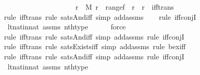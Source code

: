 \begin{isabellebody}
\ \ \ \ \ \ \ \ \ \ \ \ \ \ \ \ \ \ \ \ {\isacharparenleft}{\kern0pt}{\isasymexists}r{\isacharprime}{\kern0pt}\ {\isasymin}\ M{\isachardot}{\kern0pt}\ r{\isacharprime}{\kern0pt}\ {\isacharequal}{\kern0pt}\ range{\isacharparenleft}{\kern0pt}f{\isacharparenright}{\kern0pt}\ {\isasymand}\ r{\isacharprime}{\kern0pt}\ {\isasymsubseteq}\ r{\isacharparenright}{\kern0pt}{\isachardoublequoteclose}\ \ iff{\isacharunderscore}{\kern0pt}trans{\isacharparenright}{\kern0pt}\isanewline
\ \ \ \isamarkupfalse%
{\isacharparenleft}{\kern0pt}rule\ iff{\isacharunderscore}{\kern0pt}trans{\isacharcomma}{\kern0pt}\ rule\ sats{\isacharunderscore}{\kern0pt}And{\isacharunderscore}{\kern0pt}iff{\isacharcomma}{\kern0pt}\ simp\ add{\isacharcolon}{\kern0pt}assms{\isacharparenright}{\kern0pt}\isanewline
\ \ \ \isamarkupfalse%
{\isacharparenleft}{\kern0pt}rule\ iff{\isacharunderscore}{\kern0pt}conjI{}{\isacharparenright}{\kern0pt}\isanewline
\ \ \isamarkupfalse%
\ lt{\isacharunderscore}{\kern0pt}nat{\isacharunderscore}{\kern0pt}in{\isacharunderscore}{\kern0pt}nat\ assms\ nth{\isacharunderscore}{\kern0pt}type\isanewline
\ \ \ \ \isamarkupfalse%
\ force\isanewline
\ \ \ \isamarkupfalse%
{\isacharparenleft}{\kern0pt}rule\ iff{\isacharunderscore}{\kern0pt}trans{\isacharcomma}{\kern0pt}\ rule\ sats{\isacharunderscore}{\kern0pt}And{\isacharunderscore}{\kern0pt}iff{\isacharcomma}{\kern0pt}\ simp\ add{\isacharcolon}{\kern0pt}assms{\isacharcomma}{\kern0pt}\ rule\ iff{\isacharunderscore}{\kern0pt}conjI{}{\isacharparenright}{\kern0pt}\isanewline
\ \ \ \ \isamarkupfalse%
{\isacharparenleft}{\kern0pt}rule\ iff{\isacharunderscore}{\kern0pt}trans{\isacharcomma}{\kern0pt}\ rule\ sats{\isacharunderscore}{\kern0pt}Exists{\isacharunderscore}{\kern0pt}iff{\isacharcomma}{\kern0pt}\ simp\ add{\isacharcolon}{\kern0pt}assms{\isacharcomma}{\kern0pt}\ rule\ bex{\isacharunderscore}{\kern0pt}iff{\isacharparenright}{\kern0pt}{\isacharplus}{\kern0pt}\isanewline
\ \ \ \ \isamarkupfalse%
{\isacharparenleft}{\kern0pt}rule\ iff{\isacharunderscore}{\kern0pt}trans{\isacharcomma}{\kern0pt}\ rule\ sats{\isacharunderscore}{\kern0pt}And{\isacharunderscore}{\kern0pt}iff{\isacharcomma}{\kern0pt}\ simp\ add{\isacharcolon}{\kern0pt}assms{\isacharcomma}{\kern0pt}\ rule\ iff{\isacharunderscore}{\kern0pt}conjI{}{\isacharparenright}{\kern0pt}\isanewline
\ \ \isamarkupfalse%
\ lt{\isacharunderscore}{\kern0pt}nat{\isacharunderscore}{\kern0pt}in{\isacharunderscore}{\kern0pt}nat\ assms\ nth{\isacharunderscore}{\kern0pt}type\isanewline

\end{isabellebody}
